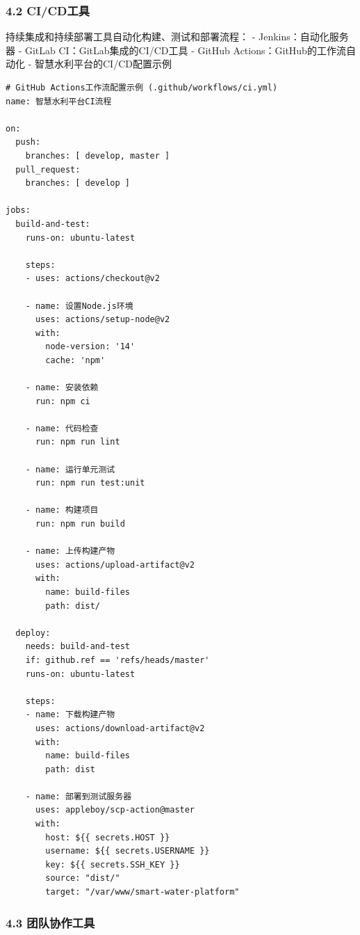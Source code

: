 \subsubsection{4.2 CI/CD工具}\label{cicdux5de5ux5177}

持续集成和持续部署工具自动化构建、测试和部署流程： -
Jenkins：自动化服务器 - GitLab CI：GitLab集成的CI/CD工具 - GitHub
Actions：GitHub的工作流自动化 - 智慧水利平台的CI/CD配置示例

\begin{lstlisting}
# GitHub Actions工作流配置示例 (.github/workflows/ci.yml)
name: 智慧水利平台CI流程

on:
  push:
    branches: [ develop, master ]
  pull_request:
    branches: [ develop ]

jobs:
  build-and-test:
    runs-on: ubuntu-latest
    
    steps:
    - uses: actions/checkout@v2
    
    - name: 设置Node.js环境
      uses: actions/setup-node@v2
      with:
        node-version: '14'
        cache: 'npm'
    
    - name: 安装依赖
      run: npm ci
    
    - name: 代码检查
      run: npm run lint
    
    - name: 运行单元测试
      run: npm run test:unit
    
    - name: 构建项目
      run: npm run build
    
    - name: 上传构建产物
      uses: actions/upload-artifact@v2
      with:
        name: build-files
        path: dist/

  deploy:
    needs: build-and-test
    if: github.ref == 'refs/heads/master'
    runs-on: ubuntu-latest
    
    steps:
    - name: 下载构建产物
      uses: actions/download-artifact@v2
      with:
        name: build-files
        path: dist
    
    - name: 部署到测试服务器
      uses: appleboy/scp-action@master
      with:
        host: ${{ secrets.HOST }}
        username: ${{ secrets.USERNAME }}
        key: ${{ secrets.SSH_KEY }}
        source: "dist/"
        target: "/var/www/smart-water-platform"
\end{lstlisting}

\subsubsection{4.3
团队协作工具}\label{ux56e2ux961fux534fux4f5cux5de5ux5177}

